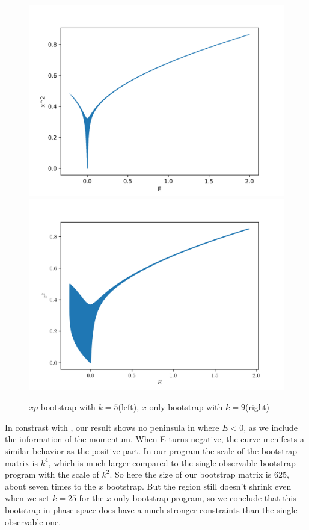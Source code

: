 \documentclass[aps,prl, preprint,amsmath, amssymb]{revtex4-2}
\begin{document}
\begin{figure}
    \includegraphics[width=0.45\linewidth]{plot_5.png}
    \includegraphics[width=0.45\linewidth]{x_9.png}
    \caption{$xp$ bootstrap with $k = 5$(left), $x$ only bootstrap with $k = 9$(right)}
    \label{fig:doublewell}
\end{figure}

% 

In constrast with \cite{Nakayama_2022}, our result shows no peninsula in where $E < 0$, as we include the information of the momentum. When E turns negative, the curve menifests a similar behavior as the positive part. In our program the scale of the bootstrap matrix is $k^4$, which is much larger compared to the single observable bootstrap program with the scale of $k^2$. So here the size of our bootstrap matrix is $625$, about seven times to the $x$ bootstrap. But the region still doesn't shrink even when we set $k = 25$ for the $x$ only bootstrap program, so we conclude that this bootstrap in phase space does have a much stronger constraints than the single observable one.

\end{document}
